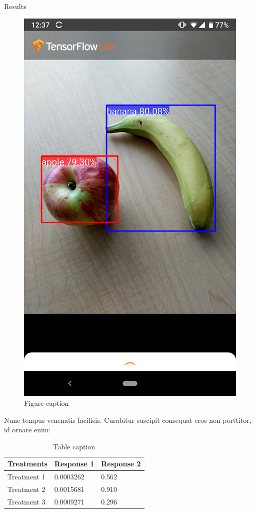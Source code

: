 \documentclass[final]{beamer}
\newlength{\onecolwid}
\begin{document}
\begin{frame}[t]
\begin{columns}[t]
\begin{column}{\onecolwid}
\begin{block}{Results}
\begin{figure}
\includegraphics[width=0.6\linewidth]{android_apple_banana.png}
\caption{Figure caption}
\end{figure}

Nunc tempus venenatis facilisis. Curabitur suscipit consequat eros non porttitor, id ornare enim:

\begin{table}
\vspace{2ex}
\begin{tabular}{l l l}
\toprule
\textbf{Treatments} & \textbf{Response 1} & \textbf{Response 2}\\
\midrule
Treatment 1 & 0.0003262 & 0.562 \\
Treatment 2 & 0.0015681 & 0.910 \\
Treatment 3 & 0.0009271 & 0.296 \\
\bottomrule
\end{tabular}
\caption{Table caption}
\end{table}

\end{block}

\end{column} %


\end{columns}
\end{frame}
\end{document}

